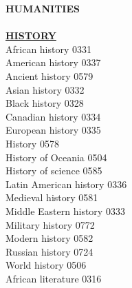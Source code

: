\documentclass[9pt]{article}
\newcommand{\categoryheading}[1]{{\fontsize{8}{11}\selectfont \textbf{\uline{#1}}}}
\begin{document}
\begin{multicols}{3}
\textbf{HUMANITIES} \leavevmode \\
\leavevmode \\
\categoryheading{HISTORY} \leavevmode \\
African history \hfill 0331 \leavevmode \\
American history \hfill 0337 \leavevmode \\
Ancient history \hfill 0579 \leavevmode \\
Asian history \hfill 0332 \leavevmode \\
Black history \hfill 0328 \leavevmode \\
Canadian history \hfill 0334 \leavevmode \\
European history \hfill 0335 \leavevmode \\
History \hfill 0578 \leavevmode \\
History of Oceania \hfill 0504 \leavevmode \\
History of science \hfill 0585 \leavevmode \\
Latin American history \hfill 0336 \leavevmode \\
Medieval history \hfill 0581 \leavevmode \\
Middle Eastern history \hfill 0333 \leavevmode \\
Military history \hfill 0772 \leavevmode \\
Modern history \hfill 0582 \leavevmode \\
Russian history \hfill 0724 \leavevmode \\
World history \hfill 0506 \leavevmode \\
African literature \hfill 0316


\end{multicols}
\end{document}
